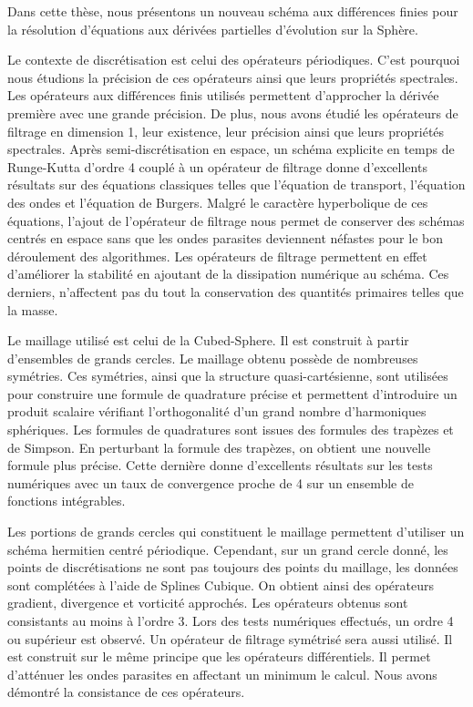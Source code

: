 
Dans cette thèse, nous présentons un nouveau schéma aux différences finies pour la résolution d'équations aux dérivées partielles d'évolution sur la Sphère.

Le contexte de discrétisation est celui des opérateurs périodiques. C'est pourquoi nous étudions la précision de ces opérateurs ainsi que leurs propriétés spectrales. Les opérateurs aux différences finis utilisés permettent d'approcher la dérivée première avec une grande précision. De plus, nous avons étudié les opérateurs de filtrage en dimension 1, leur existence, leur précision ainsi que leurs propriétés spectrales.
Après semi-discrétisation en espace, un schéma explicite en temps de Runge-Kutta d'ordre 4 couplé à un opérateur de filtrage donne d'excellents résultats sur des équations classiques telles que l'équation de transport, l'équation des ondes et l'équation de Burgers. Malgré le caractère hyperbolique de ces équations, l'ajout de l'opérateur de filtrage nous permet de conserver des schémas centrés en espace sans que les ondes parasites deviennent néfastes pour le bon déroulement des algorithmes. Les opérateurs de filtrage permettent en effet d'améliorer la stabilité en ajoutant de la dissipation numérique au schéma. Ces derniers, n'affectent pas du tout la conservation des quantités primaires telles que la masse.

Le maillage utilisé est celui de la Cubed-Sphere. Il est construit à partir d'ensembles de grands cercles. Le maillage obtenu possède de nombreuses symétries. Ces symétries, ainsi que la structure quasi-cartésienne, sont utilisées pour construire une formule de quadrature précise et permettent d'introduire un produit scalaire vérifiant l'orthogonalité d'un grand nombre d'harmoniques sphériques. Les formules de quadratures sont issues des formules des trapèzes et de Simpson. En perturbant la formule des trapèzes, on obtient une nouvelle formule plus précise. Cette dernière donne d'excellents résultats sur les tests numériques avec un taux de convergence proche de 4 sur un ensemble de fonctions intégrables. 

Les portions de grands cercles qui constituent le maillage permettent d'utiliser un schéma hermitien centré périodique. Cependant, sur un grand cercle donné, les points de discrétisations ne sont pas toujours des points du maillage, les données sont complétées à l'aide de Splines Cubique. On obtient ainsi des opérateurs gradient, divergence et vorticité approchés. Les opérateurs obtenus sont consistants au moins à l'ordre 3. Lors des tests numériques effectués, un ordre 4 ou supérieur est observé. Un opérateur de filtrage symétrisé sera aussi utilisé. Il est construit sur le même principe que les opérateurs différentiels. Il permet d'atténuer les ondes parasites en affectant un minimum le calcul. Nous avons démontré la consistance de ces opérateurs.

